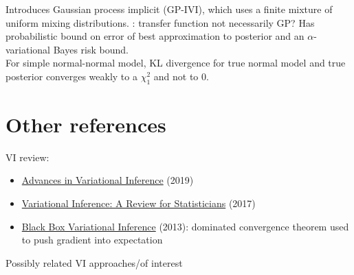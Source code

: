 \documentclass[10pt]{article}
\begin{document}
Introduces Gaussian process implicit \vi (GP-IVI), which uses a finite mixture of uniform mixing distributions. \todo: transfer function not necessarily GP? Has probabilistic bound on error of best approximation to posterior and an $\alpha$-variational Bayes risk bound.
\\

For simple normal-normal model, KL divergence for true normal model and true posterior converges weakly to a $\chi_1^2$ and not to 0.


\newpage


\section{Other references}

VI review:
\begin{itemize}
\item
\href{https://s3.amazonaws.com/ieeecs.cdn.csdl.content/trans/tp/2019/08/08588399.pdf?AWSAccessKeyId=ASIA2Z6GPE73ITPNF4HV&Expires=1646432232&Signature=%2BwbeAhSyM%2FMqzaAhLaunhuq30BI%3D&x-amz-security-token=IQoJb3JpZ2luX2VjEP7%2F%2F%2F%2F%2F%2F%2F%2F%2F%2FwEaCXVzLWVhc3QtMSJGMEQCIGoE%2FVHY77X2Kpq0J47Ic29AHEKJ%2F%2FS0foSv98aaP%2F%2BxAiAYu9FImOV6wjyu7v9HkfGlfyytEvSd2wujoh7wIivaTyqdAghmEAAaDDc0MjkwODcwMDY2MiIMYEqAQr9DL2OWCGlbKvoB58nRjaBdUqwysmhAcnlM2JP60usEfHlgP0Bn2xGYd1kZJPiEKzmA%2F76Bo7YRZ2z%2FpCEaHPV7aFI6ikqSiJToz5QlGqPUQp5GF6qR5TSKEJ5oMTODfVyUt5xdcYOww012wn%2FyqAE3T9hRTF%2FyxhZeY6Q1xrj3Bzu8p0jP7NO30Xoje2Oct8JA6sOwhgFEL5rjtIpPoiiAywnSeWz8Ia8ra4tpCOPbG8T3SLq%2BFE4SS3BrviPuGWH0b0vr2EzBSZEoWFySA87d27hh99%2B%2BsLKLvcu4u3VGRUWb%2FpwIYAT88MBxL1RhCazyRj4eByB%2FsbVAhmGQ0bYAYYZT1TDqhYqRBjqbAcZHTiSLr48H4Ha2O6bVtVfH9%2B8e%2FmWAg2joY8DUAAvhdiGeqGLdPfgpNE0%2BpXfJI%2BKR8LeVrJvtfpYI3LV2RQn%2B3y2cnzIrosiNxE68tL4U%2BsW4uor4O6eZ8qvF%2Bvr7ncAy4rulMRlaqpgY%2FehIGk5UxsUPTr4zC%2BYNJXlKu28DlNal14YG5ugTN3VC5sgxL%2B%2Bq%2BEp8ibbwRzSf}{Advances in Variational Inference} (2019)
\item
\href{https://www.tandfonline.com/doi/full/10.1080/01621459.2017.1285773}{Variational Inference: A Review for Statisticians} (2017)
\item
\href{https://arxiv.org/pdf/1401.0118.pdf}{Black Box Variational Inference} (2013): dominated convergence theorem used to push gradient into expectation
\end{itemize}
Possibly related VI approaches/of interest
\end{document}
